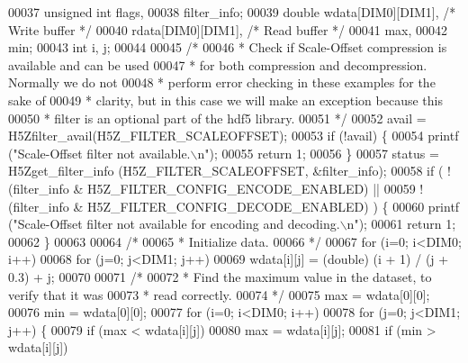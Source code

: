 \begin{DoxyCode}
00037     \textcolor{keywordtype}{unsigned} \textcolor{keywordtype}{int}    flags,
00038                     filter\_info;
00039     \textcolor{keywordtype}{double}          wdata[DIM0][DIM1],          \textcolor{comment}{/* Write buffer */}
00040                     rdata[DIM0][DIM1],          \textcolor{comment}{/* Read buffer */}
00041                     max,
00042                     min;
00043     \textcolor{keywordtype}{int}             i, j;
00044 
00045     \textcolor{comment}{/*}
00046 \textcolor{comment}{     * Check if Scale-Offset compression is available and can be used}
00047 \textcolor{comment}{     * for both compression and decompression.  Normally we do not}
00048 \textcolor{comment}{     * perform error checking in these examples for the sake of}
00049 \textcolor{comment}{     * clarity, but in this case we will make an exception because this}
00050 \textcolor{comment}{     * filter is an optional part of the hdf5 library.}
00051 \textcolor{comment}{     */}
00052     avail = H5Zfilter\_avail(H5Z\_FILTER\_SCALEOFFSET);
00053     \textcolor{keywordflow}{if} (!avail) \{
00054         printf (\textcolor{stringliteral}{"Scale-Offset filter not available.\(\backslash\)n"});
00055         \textcolor{keywordflow}{return} 1;
00056     \}
00057     status = H5Zget\_filter\_info (H5Z\_FILTER\_SCALEOFFSET, &filter\_info);
00058     \textcolor{keywordflow}{if} ( !(filter\_info & H5Z\_FILTER\_CONFIG\_ENCODE\_ENABLED) ||
00059                 !(filter\_info & H5Z\_FILTER\_CONFIG\_DECODE\_ENABLED) ) \{
00060         printf (\textcolor{stringliteral}{"Scale-Offset filter not available for encoding and decoding.\(\backslash\)n"});
00061         \textcolor{keywordflow}{return} 1;
00062     \}
00063 
00064     \textcolor{comment}{/*}
00065 \textcolor{comment}{     * Initialize data.}
00066 \textcolor{comment}{     */}
00067     \textcolor{keywordflow}{for} (i=0; i<DIM0; i++)
00068         \textcolor{keywordflow}{for} (j=0; j<DIM1; j++)
00069             wdata[i][j] = (\textcolor{keywordtype}{double}) (i + 1) / (j + 0.3) + j;
00070 
00071     \textcolor{comment}{/*}
00072 \textcolor{comment}{     * Find the maximum value in the dataset, to verify that it was}
00073 \textcolor{comment}{     * read correctly.}
00074 \textcolor{comment}{     */}
00075     max = wdata[0][0];
00076     min = wdata[0][0];
00077     \textcolor{keywordflow}{for} (i=0; i<DIM0; i++)
00078         \textcolor{keywordflow}{for} (j=0; j<DIM1; j++) \{
00079             \textcolor{keywordflow}{if} (max < wdata[i][j])
00080                 max = wdata[i][j];
00081             \textcolor{keywordflow}{if} (min > wdata[i][j])

\end{DoxyCode}
